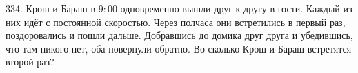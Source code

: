 334. Крош и Бараш в $9:00$ одновременно вышли друг к другу в гости. Каждый из них идёт с постоянной скоростью. Через полчаса они встретились в первый раз, поздоровались и пошли дальше. Добравшись до домика друг друга и убедившись, что там никого нет, оба повернули обратно. Во сколько Крош и Бараш встретятся второй раз?\\
